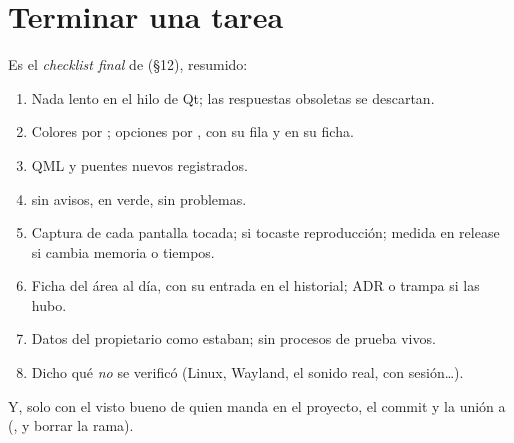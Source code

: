 \section{Terminar una tarea}

Es el \emph{checklist final} de  (§12), resumido:

\begin{enumerate}
  \item Nada lento en el hilo de Qt; las respuestas obsoletas se descartan.
  \item Colores por ; opciones por , con su fila y en su ficha.
  \item QML y puentes nuevos registrados.
  \item {} sin avisos,  en verde,
   sin problemas.
  \item Captura de cada pantalla tocada;  si tocaste reproducción; medida en
  release si cambia memoria o tiempos.
  \item Ficha del área al día, con su entrada en el historial; ADR o trampa si las hubo.
  \item Datos del propietario como estaban; sin procesos de prueba vivos.
  \item Dicho qué \emph{no} se verificó (Linux, Wayland, el sonido real, con sesión\dots).
\end{enumerate}

Y, solo con el visto bueno de quien manda en el proyecto, el commit y la unión a 
(, y borrar la rama).
